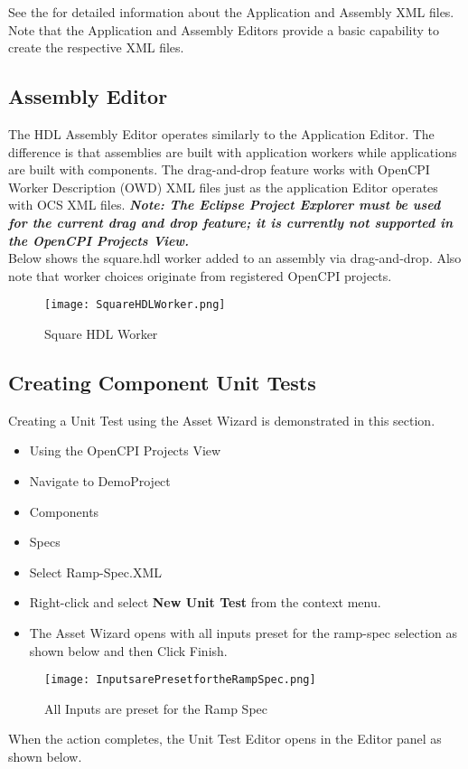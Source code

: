 See the  for detailed information about the Application and Assembly XML files.
Note that the Application and Assembly Editors provide a basic capability to create the respective XML files.
\subsection{Assembly Editor}
The HDL Assembly Editor operates similarly to the Application Editor. The difference is that assemblies are built with application workers while applications are built with components. The drag-and-drop feature works with OpenCPI Worker Description (OWD) XML files just as the application Editor operates with OCS XML files. \textbf{\emph{Note: The Eclipse Project Explorer must be used for the current drag and drop feature; it is currently not supported in the OpenCPI Projects View.}}\\
Below shows the square.hdl worker added to an assembly via drag-and-drop. Also note that worker choices originate from registered OpenCPI projects.
\begin{figure}[h!]
	\centering
	\caption{Square HDL Worker}{}
	\texttt{[image: SquareHDLWorker.png]}
 \end{figure}
\subsection{Creating Component Unit Tests}
Creating a Unit Test using the Asset Wizard is demonstrated in this section.
\begin{itemize}
\item	Using the OpenCPI Projects View
\item	Navigate to DemoProject
\item	Components
\item	Specs
\item	Select Ramp-Spec.XML
\item	Right-click and select \textbf{New Unit Test} from the context menu.
\item The Asset Wizard opens with all inputs preset for the ramp-spec selection as shown below and then Click Finish.
\end{itemize}
\begin{figure}[h!]
	\centering
	\caption{All Inputs are preset for the Ramp Spec}{}
	\texttt{[image: InputsarePresetfortheRampSpec.png]}
 \end{figure}
When the action completes, the Unit Test Editor opens in the Editor panel as shown below. \\

